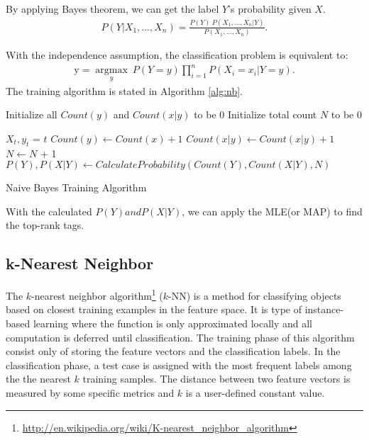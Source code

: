 By applying Bayes theorem, we can get the label $Y$'s probability given $X$.
\begin{gather}
    P(Y \vert X_1,\dots,X_n) = \frac{P(Y) \ P(X_1,\dots,X_n\vert Y)}{P(X_1,\dots,X_n)}. 
\end{gather}

With the independence assumption, the classification problem is equivalent to:
\begin{gather}
    \mathrm{y} = \underset{y}{\operatorname{argmax}} \ P(Y=y) \displaystyle\prod_{i=1}^n P(X_i=x_i\vert Y=y).
\end{gather}
The training algorithm is stated in Algorithm \ref{alg:nb}.

\IncMargin{1em}
\begin{algorithm}
\label{alg:nb}
\BlankLine
Initialize all $Count(y)$ and $Count(x|y)$ to be 0\;
Initialize total count $N$ to be 0\;

 {
    $X_t, y_t$ = $t$\;
     {
        $Count(y) \leftarrow Count(x) + 1$ \;
        $Count(x|y) \leftarrow Count(x|y) + 1$ \;
        $N \leftarrow N$ + 1 \;
    }
}
\Return $P(Y), P(X|Y) \leftarrow CalculateProbability(Count(Y), Count(X|Y), N)$

\caption{Naive Bayes Training Algorithm}\label{algo_disjdecomp}
\end{algorithm}
\DecMargin{1em}

With the calculated $P(Y) and P(X|Y)$, we can apply the MLE(or MAP) to find the top-rank tags.

\subsection{k-Nearest Neighbor}

The $k$-nearest neighbor algorithm\footnote{\url{http://en.wikipedia.org/wiki/K-nearest\_neighbor\_algorithm}} ($k$-NN) is a method for classifying objects based on closest training examples in the feature space. It is type of instance-based learning where the function is only approximated locally and all computation is deferred until classification. The training phase of this algorithm consist only of storing the feature vectors and the classification labels. In the classification phase, a test case is assigned with the most frequent labels among the the nearest $k$ training samples. The distance between two feature vectors is measured by some specific metrics and $k$ is a user-defined constant value.


